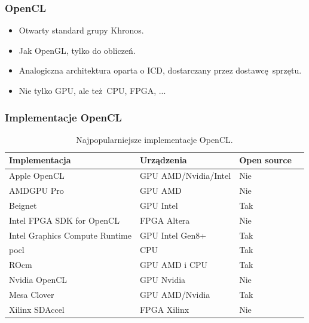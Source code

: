 \documentclass[dvipsnames,table]{beamer}
\begin{document}
\begin{frame}
	\frametitle{OpenCL}
\begin{itemize}
	\item Otwarty standard grupy Khronos.
	\item Jak OpenGL, tylko do obliczeń.
	\item Analogiczna architektura oparta o ICD, dostarczany przez dostawcę sprzętu.
	\item Nie tylko GPU, ale też CPU, FPGA, ...
\end{itemize}
\end{frame}


\begin{frame}[fragile]
	\frametitle{Implementacje OpenCL}
\begin{table}[]
\centering
\caption{Najpopularniejsze implementacje OpenCL.}
\label{porownanie}
\scriptsize
\begin{tabular}{llll}
\hline
Implementacja &  Urządzenia  & Open source   \\ \hline
Apple OpenCL & GPU AMD/Nvidia/Intel & Nie \\
AMDGPU Pro & GPU AMD & Nie \\
Beignet & GPU Intel & Tak \\
Intel FPGA SDK for OpenCL & FPGA Altera & Nie \\
Intel Graphics Compute Runtime & GPU Intel Gen8+ & Tak \\
pocl & CPU & Tak \\
ROcm & GPU AMD i CPU & Tak \\
Nvidia OpenCL & GPU Nvidia & Nie \\
Mesa Clover & GPU AMD/Nvidia & Tak \\
Xilinx SDAccel & FPGA Xilinx & Nie \\ \hline
\end{tabular}
\normalsize
\end{table}
\end{frame}
\end{document}
